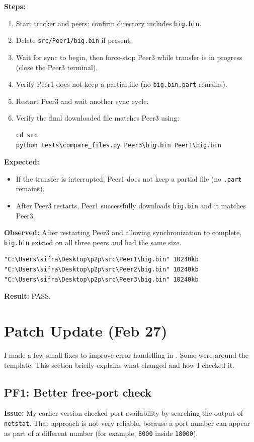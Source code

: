 \documentclass[11pt]{article}
\begin{document}
\textbf{Steps:}
\begin{enumerate}[noitemsep]
  \item Start tracker and peers; confirm directory includes \texttt{big.bin}.
  \item Delete \texttt{src/Peer1/big.bin} if present.
  \item Wait for sync to begin, then force-stop Peer3 while transfer is in progress (close the Peer3 terminal).
  \item Verify Peer1 does not keep a partial file (no \texttt{big.bin.part} remains).
  \item Restart Peer3 and wait another sync cycle.
  \item Verify the final downloaded file matches Peer3 using:
\begin{lstlisting}
cd src
python tests\compare_files.py Peer3\big.bin Peer1\big.bin
\end{lstlisting}
\end{enumerate}

\textbf{Expected:}
\begin{itemize}[noitemsep]
  \item If the transfer is interrupted, Peer1 does not keep a partial file (no \texttt{.part} remains).
  \item After Peer3 restarts, Peer1 successfully downloads \texttt{big.bin} and it matches Peer3.
\end{itemize}

\textbf{Observed:} After restarting Peer3 and allowing synchronization to complete, \texttt{big.bin} existed on all three peers and had the same size.
\begin{lstlisting}
"C:\Users\sifra\Desktop\p2p\src\Peer1\big.bin" 10240kb
"C:\Users\sifra\Desktop\p2p\src\Peer2\big.bin" 10240kb
"C:\Users\sifra\Desktop\p2p\src\Peer3\big.bin" 10240kb
\end{lstlisting}

\textbf{Result:} PASS.

\section{Patch Update (Feb 27)}
I made a few small fixes to improve error handelling in . Some were around the template. This section briefly explains what changed and how I checked it.

\subsection{PF1: Better free-port check}
\textbf{Issue:} My earlier version checked port availability by searching the output of \texttt{netstat}. That approach is not very reliable, because a port number can appear as part of a different number (for example, \texttt{8000} inside \texttt{18000}).
\end{document}
